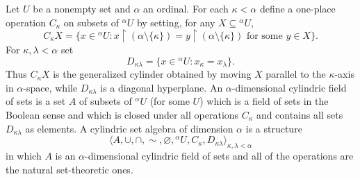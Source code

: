 Let $U$ be a nonempty set and $\alpha$ an ordinal. For each $\kappa < \alpha$ define a one-place operation $C_\kappa$ on subsets of ${}^\alpha U$ by setting, for any $X \subseteq {}^\alpha U$,
$$C_\kappa X = \{x \in {}^\alpha U : x \upharpoonright (\alpha \setminus \{\kappa\}) = y \upharpoonright (\alpha \setminus \{\kappa\}) \text{ for some } y \in X\}.$$
For $\kappa, \lambda < \alpha$ set
$$D_{\kappa \lambda} = \{x \in {}^\alpha U : x_\kappa = x_\lambda\}.$$
Thus $C_\kappa X$ is the generalized cylinder obtained by moving $X$ parallel to the $\kappa$-axis in $\alpha$-space, while $D_{\kappa \lambda}$ is a diagonal hyperplane. An $\alpha$-dimensional cylindric field of sets is a set $A$ of subsets of ${}^\alpha U$ (for some $U$) which is a field of sets in the Boolean sense and which is closed under all operations $C_\kappa$ and contains all sets $D_{\kappa \lambda}$ as elements. A cylindric set algebra of dimension $\alpha$ is a structure
$$\langle A, \cup, \cap, \sim, \varnothing, {}^\alpha U, C_\kappa, D_{\kappa \lambda} \rangle_{\kappa,\lambda < \alpha}$$
in which $A$ is an $\alpha$-dimensional cylindric field of sets and all of the operations are the natural set-theoretic ones.
